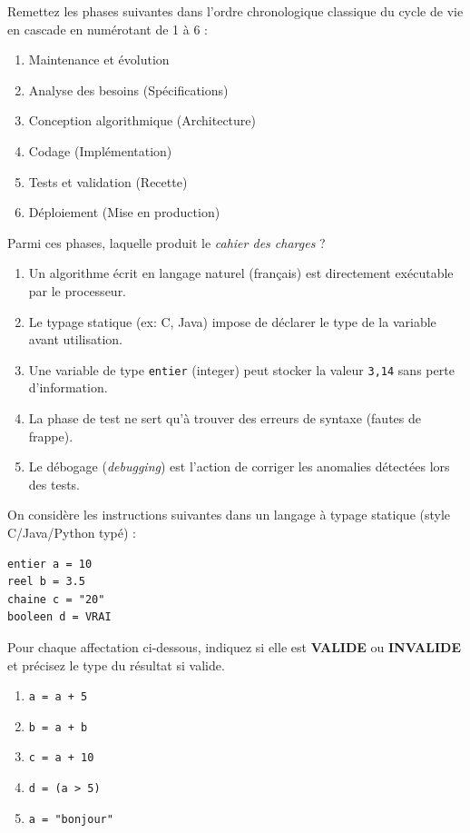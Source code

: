 \documentclass[11pt]{article}
\begin{document}
\begin{exercice}
Remettez les phases suivantes dans l'ordre chronologique classique du cycle de vie en cascade en numérotant de 1 à 6 :
\begin{enumerate}
    \item \dotfill \quad Maintenance et évolution
    \item \dotfill \quad Analyse des besoins (Spécifications)
    \item \dotfill \quad Conception algorithmique (Architecture)
    \item \dotfill \quad Codage (Implémentation)
    \item \dotfill \quad Tests et validation (Recette)
    \item \dotfill \quad Déploiement (Mise en production)
\end{enumerate}
\noindent Parmi ces phases, laquelle produit le \textit{cahier des charges} ? \dotfill
\end{exercice}

\begin{exercice}
\begin{enumerate}
    \item Un algorithme écrit en langage naturel (français) est directement exécutable par le processeur.
    \item Le typage statique (ex: C, Java) impose de déclarer le type de la variable avant utilisation.
    \item Une variable de type \texttt{entier} (integer) peut stocker la valeur \texttt{3,14} sans perte d'information.
    \item La phase de test ne sert qu'à trouver des erreurs de syntaxe (fautes de frappe).
    \item Le débogage (\textit{debugging}) est l'action de corriger les anomalies détectées lors des tests.
\end{enumerate}
\end{exercice}

\begin{exercice}
On considère les instructions suivantes dans un langage à typage statique (style C/Java/Python typé) :
\begin{verbatim}
entier a = 10
reel b = 3.5
chaine c = "20"
booleen d = VRAI
\end{verbatim}
Pour chaque affectation ci-dessous, indiquez si elle est \textbf{VALIDE} ou \textbf{INVALIDE} et précisez le type du résultat si valide.
\begin{enumerate}
    \item \texttt{a = a + 5}
    \item \texttt{b = a + b}
    \item \texttt{c = a + 10}
    \item \texttt{d = (a > 5)}
    \item \texttt{a = "bonjour"}
\end{enumerate}
\end{exercice}
\end{document}
